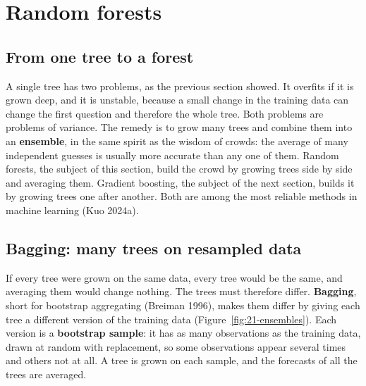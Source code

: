 \section{Random forests}
\label{sec:21-rf}

\subsection{From one tree to a forest}

A single tree has two problems, as the previous section showed. It overfits if it is grown deep, and it is unstable, because a small change in the training data can change the first question and therefore the whole tree. Both problems are problems of variance. The remedy is to grow many trees and combine them into an \textbf{ensemble}, in the same spirit as the wisdom of crowds: the average of many independent guesses is usually more accurate than any one of them. Random forests, the subject of this section, build the crowd by growing trees side by side and averaging them. Gradient boosting, the subject of the next section, builds it by growing trees one after another. Both are among the most reliable methods in machine learning (Kuo 2024a).

\subsection{Bagging: many trees on resampled data}

If every tree were grown on the same data, every tree would be the same, and averaging them would change nothing. The trees must therefore differ. \textbf{Bagging}, short for bootstrap aggregating (Breiman 1996), makes them differ by giving each tree a different version of the training data (Figure~\ref{fig:21-ensembles}). Each version is a \textbf{bootstrap sample}: it has as many observations as the training data, drawn at random with replacement, so some observations appear several times and others not at all. A tree is grown on each sample, and the forecasts of all the trees are averaged.

